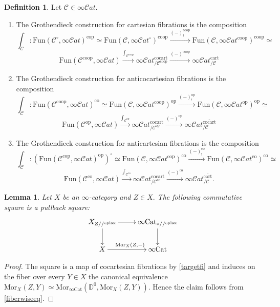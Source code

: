 \documentclass[10pt,oneside]{article}
\numberwithin{equation}{section} %
\numberwithin{figure}{section} %
\theoremstyle{plain}
\newtheorem{lemma}[theorem]{Lemma}
\theoremstyle{definition}
\newtheorem{definition}[theorem]{Definition}
\newcommand{\bD}{{\mathbb D}}
\newcommand{\mC}{{\mathcal C}}
\newcommand{\X}{X}
\newcommand{\op}{\mathrm{op}}
\newcommand{\co}{\mathrm{co}}
\newcommand{\Cat}{\mathrm{Cat}}
\newcommand{\Fun}{\mathrm{Fun}}
\newcommand{\cocart}{{\mathrm{cocart}}}
\newcommand{\cart}{{\mathrm{cart}}}
\newcommand{\oplax}{{\mathrm{oplax}}}
\newcommand{\Mor}{{\mathrm{Mor}}}
\newcommand{\cop}{\mathrm{cop}}
\newcommand{\scat}{\mathcal{C}\mathit{at}}
\begin{document}
\begin{definition}
Let $\mC \in \infty\scat$.
\begin{enumerate}[\normalfont(1)]\setlength{\itemsep}{-2pt}
\item The Grothendieck construction for cartesian fibrations is the composition
$$\int_\mC: \Fun(\mC^\circ, \infty\scat)^\cop \simeq \Fun(\mC, \infty\scat^\circ)^{\co\op} \xrightarrow{(-)^{\co\op}_!} \Fun(\mC, \infty\scat^{\co\op})^{\co\op} \simeq $$$$ \Fun(\mC^{\co\op}, \infty\scat) \xrightarrow{\int_{\mC^{\co\op}}} {\infty\scat}^\cocart_{/\mC^{\co\op}} \xrightarrow{(-)^{\co\op}} {\infty\scat}^\cart_{/\mC}$$
\item The Grothendieck construction for anticocartesian fibrations is the composition $$\int_\mC: \Fun(\mC^{\co\op}, \infty\scat)^\co \simeq \Fun(\mC, \infty\scat^{\co\op})^\op \xrightarrow{(-)^{\op}_!} \Fun(\mC, \infty\scat^\op)^\op \simeq $$$$ \Fun(\mC^\op, \infty\scat) \xrightarrow{\int_{\mC^\op}} {\infty\scat}^\cocart_{/\mC^\op} \xrightarrow{(-)^{\op}} {\infty\scat}^{\overline{\co\cart}}_{/\mC}$$
\item The Grothendieck construction for anticartesian fibrations is the composition $$\int_\mC: (\Fun(\mC^\cop, \infty\scat)^\op)^\circ \simeq \Fun(\mC, \infty\scat^\cop)^\co \xrightarrow{(-)^{\co}_!} \Fun(\mC, \infty\scat^\co)^\co \simeq $$$$ \Fun(\mC^\co, \infty\scat) \xrightarrow{\int_{\mC^\co}} {\infty\scat}^\cocart_{/\mC^\co} \xrightarrow{(-)^{\co}} {\infty\scat}^{\overline{\cart}}_{/\mC}.$$
\end{enumerate}
\end{definition}

\begin{lemma}\label{Grorep}
Let $X$ be an $\infty$-category and $Z \in X.$
The following commutative square is a pullback square:
$$
\begin{xy}
\xymatrix{
X_{Z //^\oplax} \ar[d] \ar[r]
& \infty\Cat_{*//^\oplax } \ar[d]
\\ 
X  \ar[r]^{\Mor_\X(Z,-)} & \infty\Cat
}
\end{xy}$$

\end{lemma}

\begin{proof}
The square is a map of cocartesian fibrations by \cref{targetfi} and induces on the fiber over every $Y \in X$ the canonical equivalence
$ \Mor_X(Z,Y) \simeq \Mor_{\infty\Cat}(\bD^0, \Mor_\X(Z,Y)).$
Hence the claim follows from \cref{fiberwiseeq}.
\end{proof}
\end{document}
